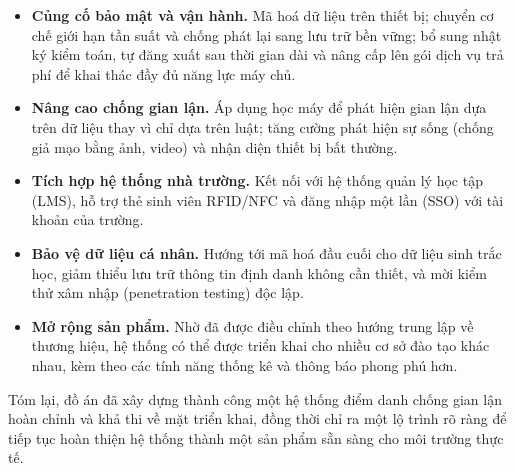\documentclass[../main.tex]{subfiles}
\begin{document}
\begin{itemize}[leftmargin=1.5em]
  \item \textbf{Củng cố bảo mật và vận hành.} Mã hoá dữ liệu trên thiết bị; chuyển cơ chế giới
  hạn tần suất và chống phát lại sang lưu trữ bền vững; bổ sung nhật ký kiểm toán, tự đăng xuất
  sau thời gian dài và nâng cấp lên gói dịch vụ trả phí để khai thác đầy đủ năng lực máy chủ.

  \item \textbf{Nâng cao chống gian lận.} Áp dụng học máy để phát hiện gian lận dựa trên dữ
  liệu thay vì chỉ dựa trên luật; tăng cường phát hiện sự sống (chống giả mạo bằng ảnh, video)
  và nhận diện thiết bị bất thường.

  \item \textbf{Tích hợp hệ thống nhà trường.} Kết nối với hệ thống quản lý học tập (LMS), hỗ
  trợ thẻ sinh viên RFID/NFC và đăng nhập một lần (SSO) với tài khoản của trường.

  \item \textbf{Bảo vệ dữ liệu cá nhân.} Hướng tới mã hoá đầu cuối cho dữ liệu sinh trắc học,
  giảm thiểu lưu trữ thông tin định danh không cần thiết, và mời kiểm thử xâm nhập (penetration
  testing) độc lập.

  \item \textbf{Mở rộng sản phẩm.} Nhờ đã được điều chỉnh theo hướng trung lập về thương hiệu,
  hệ thống có thể được triển khai cho nhiều cơ sở đào tạo khác nhau, kèm theo các tính năng
  thống kê và thông báo phong phú hơn.
\end{itemize}

Tóm lại, đồ án đã xây dựng thành công một hệ thống điểm danh chống gian lận hoàn chỉnh và khả
thi về mặt triển khai, đồng thời chỉ ra một lộ trình rõ ràng để tiếp tục hoàn thiện hệ thống
thành một sản phẩm sẵn sàng cho môi trường thực tế.
\end{document}
